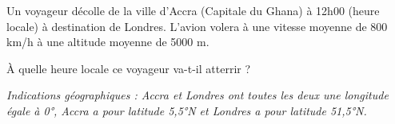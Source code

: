 
Un voyageur décolle de la ville d’Accra (Capitale du Ghana) à 12h00 (heure locale) à destination
de Londres. L’avion volera à une vitesse moyenne de 800 km/h à une altitude moyenne de
5000 m. 

\medskip

À quelle heure locale ce voyageur va-t-il atterrir ?

\medskip

\textit{Indications géographiques : Accra et Londres ont toutes les deux une longitude égale à 0°, Accra
a pour latitude 5,5°N et Londres a pour latitude 51,5°N.}